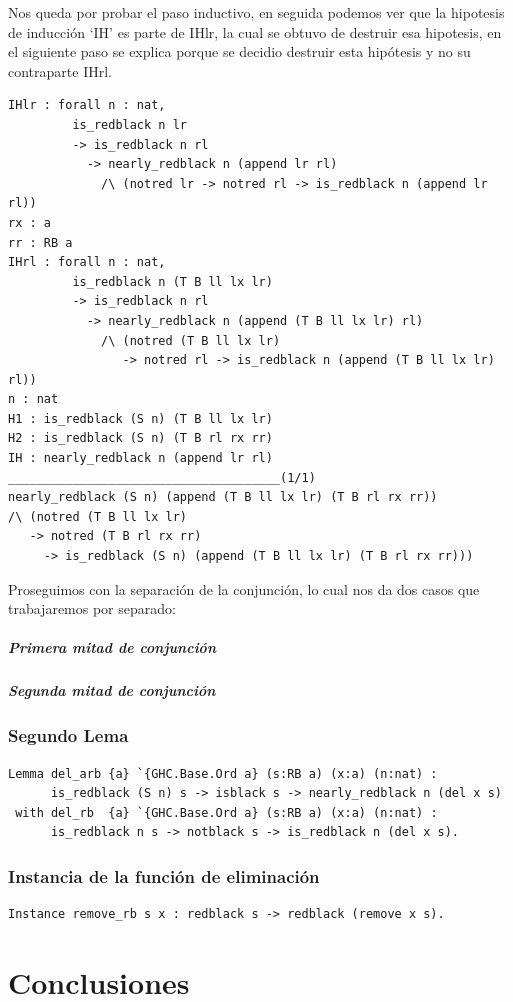 \documentclass[8pt,leqno,pdflatex,spanish]{book}
\theoremstyle{plain}
\theoremstyle{definition}
\theoremstyle{remark}
\begin{document}
Nos queda por probar el paso inductivo, en seguida podemos ver que la hipotesis de inducci\'on 
`IH' es parte de IHlr, la cual se obtuvo de destruir esa hipotesis, en el siguiente paso se explica porque se decidio destruir esta hip\'otesis y no su contraparte IHrl.

\begin{verbatim}
IHlr : forall n : nat,
         is_redblack n lr
         -> is_redblack n rl
           -> nearly_redblack n (append lr rl)
             /\ (notred lr -> notred rl -> is_redblack n (append lr rl))
rx : a
rr : RB a
IHrl : forall n : nat,
         is_redblack n (T B ll lx lr)
         -> is_redblack n rl
           -> nearly_redblack n (append (T B ll lx lr) rl)
             /\ (notred (T B ll lx lr)
                -> notred rl -> is_redblack n (append (T B ll lx lr) rl))
n : nat
H1 : is_redblack (S n) (T B ll lx lr)
H2 : is_redblack (S n) (T B rl rx rr)
IH : nearly_redblack n (append lr rl)
______________________________________(1/1)
nearly_redblack (S n) (append (T B ll lx lr) (T B rl rx rr))
/\ (notred (T B ll lx lr)
   -> notred (T B rl rx rr)
     -> is_redblack (S n) (append (T B ll lx lr) (T B rl rx rr)))
\end{verbatim}

Proseguimos con la separaci\'on de la conjunci\'on, lo cual nos da dos casos que trabajaremos por 
separado:

\paragraph{Primera mitad de conjunci\'on}
\paragraph{Segunda mitad de conjunci\'on}

\subsection{Segundo Lema}
\begin{verbatim}
Lemma del_arb {a} `{GHC.Base.Ord a} (s:RB a) (x:a) (n:nat) :
      is_redblack (S n) s -> isblack s -> nearly_redblack n (del x s)
 with del_rb  {a} `{GHC.Base.Ord a} (s:RB a) (x:a) (n:nat) :
      is_redblack n s -> notblack s -> is_redblack n (del x s).
\end{verbatim}

\subsection{Instancia de la funci\'on de eliminaci\'on}
\begin{verbatim}
Instance remove_rb s x : redblack s -> redblack (remove x s).
\end{verbatim}
\chapter{Conclusiones}  

 
\backmatter%
\end{document}
